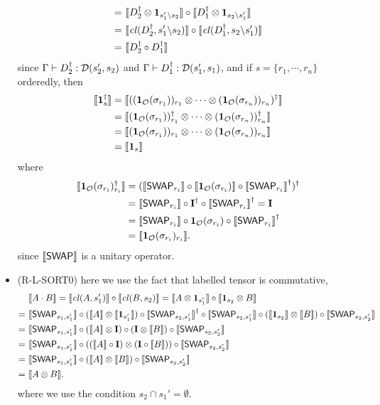 \begin{itemize}
\begin{align*}
    =\ & {\llbracket D_2^\dagger \otimes \mathbf{1}_{s_1'\backslash s_2} \rrbracket} \circ {\llbracket D_1^\dagger \otimes \mathbf{1}_{s_2\backslash s_1'} \rrbracket} \\ 
    =\ & {\llbracket {\mathit{cl}}(D_2^\dagger, s_1'\backslash s_2) \rrbracket} \circ {\llbracket {\mathit{cl}}(D_1^\dagger, s_2\backslash s_1') \rrbracket} \\ 
    =\ & {\llbracket D_2^\dagger \circ D_1^\dagger \rrbracket}
  \end{align*}
  since $\Gamma \vdash D_2^\dagger : {\mathcal{D}}(s_2',s_2)$ and $\Gamma \vdash D_1^\dagger : {\mathcal{D}}(s_1',s_1)$, and if $s = \{r_1,\cdots,r_n\}$ orderedly, then
  \begin{align*}
    {\llbracket \mathbf{1}_{s}^\dagger \rrbracket} & = {\llbracket ((\mathbf{1}_{\mathcal{O}}(\sigma_{r_1}))_{r_1}\otimes \cdots \otimes (\mathbf{1}_{\mathcal{O}}(\sigma_{r_n}))_{r_n})^\dagger  \rrbracket} \\
    & = {\llbracket (\mathbf{1}_{\mathcal{O}}(\sigma_{r_1}))_{r_1}^\dagger \otimes \cdots \otimes (\mathbf{1}_{\mathcal{O}}(\sigma_{r_n}))_{r_n}^\dagger  \rrbracket} \\
    & = {\llbracket (\mathbf{1}_{\mathcal{O}}(\sigma_{r_1}))_{r_1} \otimes \cdots \otimes (\mathbf{1}_{\mathcal{O}}(\sigma_{r_n}))_{r_n}  \rrbracket} \\
    &= {\llbracket \mathbf{1}_{s} \rrbracket}
  \end{align*}
  where 
  \begin{align*}
    {\llbracket \mathbf{1}_{\mathcal{O}}(\sigma_{r_i})_{r_i}^\dagger \rrbracket} & = 
    ({\llbracket {\mathsf{SWAP}}_{r_i} \rrbracket}\circ {\llbracket \mathbf{1}_{\mathcal{O}}(\sigma_{r_i}) \rrbracket} \circ {\llbracket {\mathsf{SWAP}}_{r_i} \rrbracket}^\dagger)^\dagger \\
    & = {\llbracket {\mathsf{SWAP}}_{r_i} \rrbracket}\circ \mathbf{I}^\dagger \circ {\llbracket {\mathsf{SWAP}}_{r_i} \rrbracket}^\dagger = \mathbf{I} \\
    & = {\llbracket {\mathsf{SWAP}}_{r_i} \rrbracket}\circ \mathbf{1}_{\mathcal{O}}(\sigma_{r_i}) \circ {\llbracket {\mathsf{SWAP}}_{r_i} \rrbracket}^\dagger \\
    & = {\llbracket \mathbf{1}_{\mathcal{O}}(\sigma_{r_i})_{r_i} \rrbracket}.
  \end{align*}
  since ${\llbracket {\mathsf{SWAP}} \rrbracket}$ is a unitary operator.

  \item (R-L-SORT0) here we use the fact that labelled tensor is commutative,
  \begin{align*}
    & {\llbracket A\cdot B \rrbracket} = {\llbracket {\mathit{cl}}(A, s'_1) \rrbracket} \circ {\llbracket {\mathit{cl}}(B, s_2) \rrbracket} = {\llbracket A\otimes \mathbf{1}_{s'_1} \rrbracket}\circ  {\llbracket \mathbf{1}_{s_2}\otimes B \rrbracket} \\
    =\ & {\llbracket {\mathsf{SWAP}}_{s_1,s'_1} \rrbracket}\circ ({\llbracket A \rrbracket}\otimes {\llbracket \mathbf{1}_{s'_1} \rrbracket})\circ {\llbracket {\mathsf{SWAP}}_{s_2,s'_1} \rrbracket}^\dagger \circ {\llbracket {\mathsf{SWAP}}_{s_2,s'_1} \rrbracket} \circ ({\llbracket \mathbf{1}_{s_2} \rrbracket}\otimes {\llbracket B \rrbracket}) \circ {\llbracket {\mathsf{SWAP}}_{s_2,s'_2} \rrbracket} \\
    =\ & {\llbracket {\mathsf{SWAP}}_{s_1,s'_1} \rrbracket}\circ ({\llbracket A \rrbracket}\otimes \mathbf{I})\circ (\mathbf{I}\otimes {\llbracket B \rrbracket}) \circ {\llbracket {\mathsf{SWAP}}_{s_2,s'_2} \rrbracket} \\
    =\ & {\llbracket {\mathsf{SWAP}}_{s_1,s'_1} \rrbracket}\circ (({\llbracket A \rrbracket}\circ \mathbf{I})\otimes (\mathbf{I}\circ {\llbracket B \rrbracket})) \circ {\llbracket {\mathsf{SWAP}}_{s_2,s'_2} \rrbracket} \\
    =\ & {\llbracket {\mathsf{SWAP}}_{s_1,s'_1} \rrbracket}\circ ({\llbracket A \rrbracket}\otimes {\llbracket B \rrbracket}) \circ {\llbracket {\mathsf{SWAP}}_{s_2,s'_2} \rrbracket} \\
    =\ & {\llbracket A\otimes B \rrbracket}.
  \end{align*}
  where we use the condition $s_2\cap s_1' = \emptyset$.


\end{itemize}
